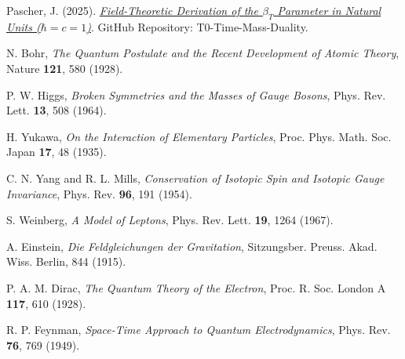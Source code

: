 \documentclass[12pt,a4paper]{article}
\theoremstyle{definition}
\theoremstyle{remark}
\begin{document}
	\begin{thebibliography}{99}
		
		Pascher, J. (2025). \href{https://github.com/jpascher/T0-Time-Mass-Duality/blob/main/2/pdf/English/DerivationVonBetaEn.pdf}{\textit{Field-Theoretic Derivation of the $\beta_T$ Parameter in Natural Units ($\hbar = c = 1$)}}. GitHub Repository: T0-Time-Mass-Duality.
		
		N. Bohr,
		\textit{The Quantum Postulate and the Recent Development of Atomic Theory},
		Nature \textbf{121}, 580 (1928).
		
		P. W. Higgs,
		\textit{Broken Symmetries and the Masses of Gauge Bosons},
		Phys. Rev. Lett. \textbf{13}, 508 (1964).
		
		H. Yukawa,
		\textit{On the Interaction of Elementary Particles},
		Proc. Phys. Math. Soc. Japan \textbf{17}, 48 (1935).
		
		C. N. Yang and R. L. Mills,
		\textit{Conservation of Isotopic Spin and Isotopic Gauge Invariance},
		Phys. Rev. \textbf{96}, 191 (1954).
		
		S. Weinberg,
		\textit{A Model of Leptons},
		Phys. Rev. Lett. \textbf{19}, 1264 (1967).
		
		A. Einstein,
		\textit{Die Feldgleichungen der Gravitation},
		Sitzungsber. Preuss. Akad. Wiss. Berlin, 844 (1915).
		
		P. A. M. Dirac,
		\textit{The Quantum Theory of the Electron},
		Proc. R. Soc. London A \textbf{117}, 610 (1928).
		
		R. P. Feynman,
		\textit{Space-Time Approach to Quantum Electrodynamics},
		Phys. Rev. \textbf{76}, 769 (1949).
		
	\end{thebibliography}
	
\end{document}
